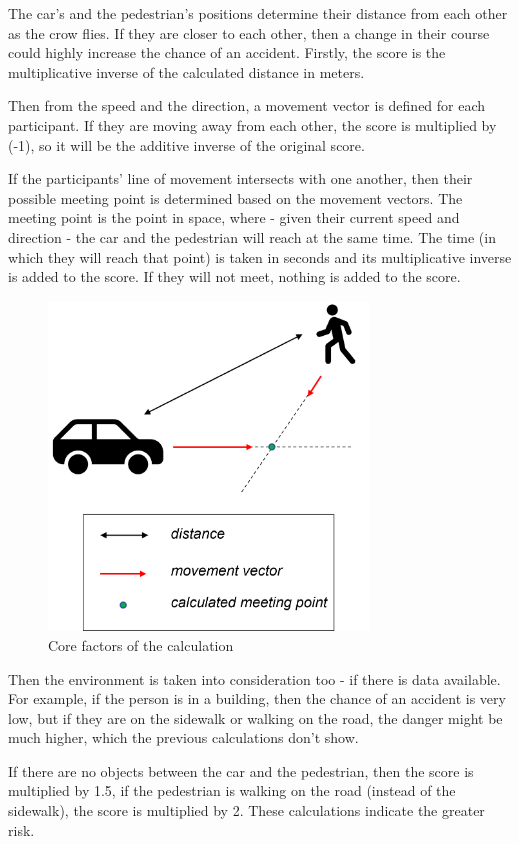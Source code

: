 \documentclass[conference]{IEEEtran}
\begin{document}
The car's and the pedestrian's positions determine their distance from each other as the crow flies. If they are closer to each other, then a change in their course could highly increase the chance of an accident. Firstly, the score is the multiplicative inverse of the calculated distance in meters.

Then from the speed and the direction, a movement vector is defined for each participant. If they are moving away from each other, the score is multiplied by (-1), so it will be the additive inverse of the original score.

If the participants' line of movement intersects with one another, then their possible meeting point is determined based on the movement vectors. The meeting point is the point in space, where - given their current speed and direction - the car and the pedestrian will reach at the same time. The time (in which they will reach that point) is taken in seconds and its multiplicative inverse is added to the score. If they will not meet, nothing is added to the score.

\begin{figure}[ht]
    \centering
    \includegraphics[width=8.5cm]{./pics/Core factors of the calculation.png}
    \caption{Core factors of the calculation}
\end{figure}

Then the environment is taken into consideration too - if there is data available. For example, if the person is in a building, then the chance of an accident is very low, but if they are on the sidewalk or walking on the road, the danger might be much higher, which the previous calculations don't show.

If there are no objects between the car and the pedestrian, then the score is multiplied by 1.5, if the pedestrian is walking on the road (instead of the sidewalk), the score is multiplied by 2. These calculations indicate the greater risk.
\end{document}
